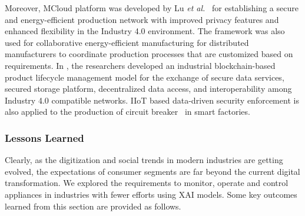 \documentclass[journal]{IEEEtran}
\begin{document}
Moreover, MCloud platform was developed by Lu \textit{et al.}~\cite{lu_energy-efficient_2019} for establishing a secure and energy-efficient production network with improved privacy features and enhanced flexibility in the Industry 4.0 environment. The framework was also used for collaborative energy-efficient manufacturing for distributed manufacturers to coordinate production processes that are customized based on requirements. In \cite{liu_industrial_2020}, the researchers developed an industrial blockchain-based product lifecycle management model for the exchange of secure data services, secured storage platform, decentralized data access, and interoperability among Industry 4.0 compatible networks. IIoT based data-driven security enforcement is also applied to the production of circuit breaker~\cite{chen_framework_2020} in smart factories. 

\subsubsection{Lessons Learned}
Clearly, as the digitization and social trends in modern industries are getting evolved, the expectations of consumer segments are far beyond the current digital transformation. We explored the requirements to monitor, operate and control appliances in industries with fewer efforts using XAI models. Some key outcomes learned from this section are provided as follows.
\end{document}
